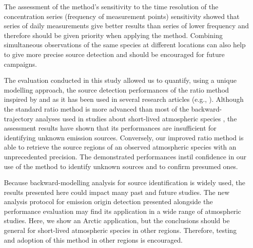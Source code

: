     The assessment of the method's sensitivity to the time resolution of the concentration series (frequency of measurement points) sensitivity showed that series of daily measurements give better results than series of lower frequency and therefore should be given priority when applying the method.
    Combining simultaneous observations of the same species at different locations can also help to give more precise source detection and should be encouraged for future campaigns.

        The evaluation conducted in this study allowed us to quantify, using a unique modelling approach, the source detection performances of the ratio method inspired by \citet{hirdman_source_2010} and as it has been used in several research articles (e.g., \citealp{irish_ice_2019, si_concentrations_2019}).
        Although the standard ratio method is more advanced than most of the backward-trajectory analyses used in studies about short-lived atmospheric species \citep{allen_evidence_2021, an_tracking_2014, hartmann_terrestrial_2021, lu_novel_2012, porter_highly_2022, raut_cross-polar_2017, wex_annual_2019}, the assessment results have shown that its performances are insufficient for identifying unknown emission sources.
        Conversely, our improved ratio method is able to retrieve the source regions of an observed atmospheric species with an unprecedented precision.
        The demonstrated performances instil confidence in our use of the method to identify unknown sources and to confirm presumed ones.

    Because backward-modelling analysis for source identification is widely used, the results presented here could impact many past and future studies. The new analysis protocol for emission origin detection presented alongside the performance evaluation may find its application in a wide range of atmospheric studies.
    Here, we show an Arctic application, but the conclusions should be general for short-lived atmospheric species in other regions. Therefore, testing and adoption of this method in other regions is encouraged.



